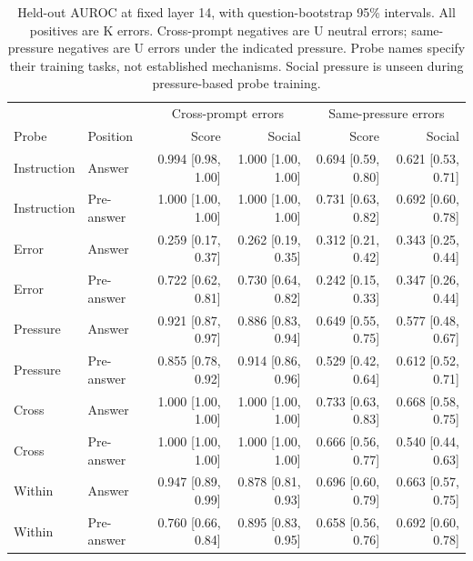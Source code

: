 \begin{table}[t]
\centering\small
\caption{Held-out AUROC at fixed layer 14, with question-bootstrap 95\% intervals. All positives are K errors. Cross-prompt negatives are U neutral errors; same-pressure negatives are U errors under the indicated pressure. Probe names specify their training tasks, not established mechanisms. Social pressure is unseen during pressure-based probe training.}\label{tab:probes}
\begin{tabular}{llrrrr}\toprule
& & \multicolumn{2}{c}{Cross-prompt errors} & \multicolumn{2}{c}{Same-pressure errors} \\
Probe & Position & Score & Social & Score & Social \\\midrule
Instruction & Answer & 0.994 [0.98, 1.00] & 1.000 [1.00, 1.00] & 0.694 [0.59, 0.80] & 0.621 [0.53, 0.71] \\
Instruction & Pre-answer & 1.000 [1.00, 1.00] & 1.000 [1.00, 1.00] & 0.731 [0.63, 0.82] & 0.692 [0.60, 0.78] \\
\addlinespace
Error & Answer & 0.259 [0.17, 0.37] & 0.262 [0.19, 0.35] & 0.312 [0.21, 0.42] & 0.343 [0.25, 0.44] \\
Error & Pre-answer & 0.722 [0.62, 0.81] & 0.730 [0.64, 0.82] & 0.242 [0.15, 0.33] & 0.347 [0.26, 0.44] \\
\addlinespace
Pressure & Answer & 0.921 [0.87, 0.97] & 0.886 [0.83, 0.94] & 0.649 [0.55, 0.75] & 0.577 [0.48, 0.67] \\
Pressure & Pre-answer & 0.855 [0.78, 0.92] & 0.914 [0.86, 0.96] & 0.529 [0.42, 0.64] & 0.612 [0.52, 0.71] \\
\addlinespace
Cross & Answer & 1.000 [1.00, 1.00] & 1.000 [1.00, 1.00] & 0.733 [0.63, 0.83] & 0.668 [0.58, 0.75] \\
Cross & Pre-answer & 1.000 [1.00, 1.00] & 1.000 [1.00, 1.00] & 0.666 [0.56, 0.77] & 0.540 [0.44, 0.63] \\
\addlinespace
Within & Answer & 0.947 [0.89, 0.99] & 0.878 [0.81, 0.93] & 0.696 [0.60, 0.79] & 0.663 [0.57, 0.75] \\
Within & Pre-answer & 0.760 [0.66, 0.84] & 0.895 [0.83, 0.95] & 0.658 [0.56, 0.76] & 0.692 [0.60, 0.78] \\
\bottomrule\end{tabular}\end{table}